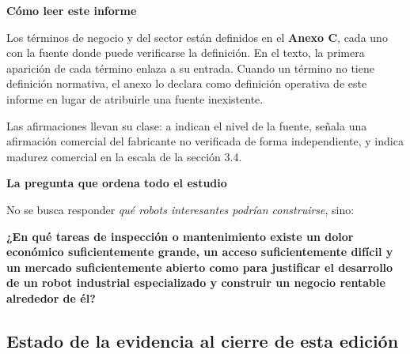 \documentclass[11pt,a4paper]{article}
\newcommand{\badge}[3]{%
  \tcbox[on line, boxsep=1pt, left=2pt, right=2pt, top=0.5pt, bottom=0.5pt,
         colback=#1, colframe=#1, arc=1pt, boxrule=0pt]%
    {\color{#2}\sffamily\scriptsize\bfseries #3}}
\newenvironment{notaclave}[1]
  {\begin{notaclavebase}{\sffamily\scriptsize\bfseries\color{amber}#1}\par\vspace{2pt}}
  {\end{notaclavebase}}
\newenvironment{notadato}[1]
  {\begin{notadatobase}{\sffamily\scriptsize\bfseries\color{navy}#1}\par\vspace{2pt}}
  {\end{notadatobase}}
\begin{document}
\begin{notadato}{Cómo leer este informe}
Los términos de negocio y del sector están definidos en el \textbf{Anexo C}, cada uno con la fuente donde puede verificarse la definición. En el texto, la primera aparición de cada término enlaza a su entrada. Cuando un término no tiene definición normativa, el anexo lo declara como definición operativa de este informe en lugar de atribuirle una fuente inexistente.

Las afirmaciones llevan su clase: \badge{navy}{white}{A} a \badge{lgray}{ink}{D} indican el nivel de la fuente, \badge{lamber}{amber}{Declaración} señala una afirmación comercial del fabricante no verificada de forma independiente, y \badge{lblue}{ink}{M4} indica madurez comercial en la escala de la sección 3.4.

\end{notadato}
\begin{notaclave}{La pregunta que ordena todo el estudio}
No se busca responder \emph{qué robots interesantes podrían construirse}, sino:

\textbf{¿En qué tareas de inspección o mantenimiento existe un dolor económico suficientemente grande, un acceso suficientemente difícil y un mercado suficientemente abierto como para justificar el desarrollo de un robot industrial especializado y construir un negocio rentable alrededor de él?}

\end{notaclave}

\subsection*{Estado de la evidencia al cierre de esta edición}
\end{document}
